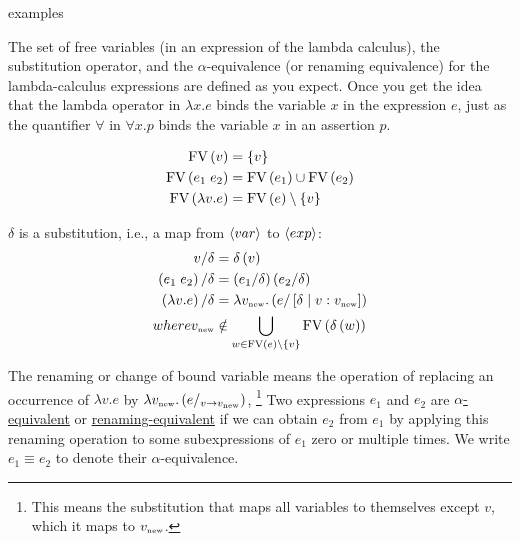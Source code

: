 \begin{enumcirc}
	\item
	examples
	\todo
	\item
	The set of free variables (in an expression of the lambda calculus), the
	substitution operator, and the $\alpha$-equivalence (or renaming equivalence)
	for the lambda-calculus expressions are defined as you expect.
	Once you get the idea that the lambda operator in $\lambda x. e$ binds the
	variable $x$ in the expression $e$, just as the quantifier $\forall$ in
	$\forall x. p$ binds the variable $x$ in an assertion $p$.
	\begin{enumrm}
		\item
		\begin{align*}
			\textrm{FV}\left(  v  \right)            & = \left\{ v \right\}                  \\
			\textrm{FV}\left(  e_1 \; e_2  \right)   & = \textrm{FV}\left(  e_1  \right) \cup \textrm{FV}\left(  e_2  \right)      \\
			\textrm{FV}\left(  \lambda v. e  \right) & = \textrm{FV}\left(  e  \right) \setminus \left\{ v \right\} \\
		\end{align*}
		\item
		$\delta$ is a substitution, i.e., a map from $\left\langle var \right\rangle$ to $\left\langle exp \right\rangle$:
		\begin{align*}
			v / \delta                    & = \delta\left( v \right)                                                             \\
			\left( e_1 \; e_2 \right) / \delta   & = \left( e_1 / \delta \right) \left( e_2 / \delta \right)                                   \\
			\left( \lambda v. e \right) / \delta & = \lambda v_{\textrm{\tiny new}}. \left( e / \left[ \delta \; \middle\vert \; v: v_{\textrm{\tiny new}} \right] \right) \\
			where v_{\textrm{\tiny new}}      & \notin \bigcup_{w \in \textrm{FV}\left(  e  \right) \setminus \left\{ v \right\}} \textrm{FV}\left(  \delta\left( w \right)  \right)
		\end{align*}
		\item
		The renaming or change of bound variable means the operation of replacing an
		occurrence of $\lambda v. e$ by
		$\lambda v_{\textrm{\tiny new}}. \left( e/_{v \rightarrow v_{\textrm{\tiny new}}} \right)$,
		\footnote{
			This means the substitution that maps all variables to themselves except $v$, which
			it maps to $v_{\textrm{\tiny new}}$.
		}
		Two expressions $e_1$ and $e_2$ are \ul{$\alpha$-equivalent} or
		\ul{renaming-equivalent} if we can obtain $e_2$ from $e_1$ by applying this
		renaming operation to some subexpressions of $e_1$ zero or multiple times.
		We write $e_1 \equiv e_2$ to denote their $\alpha$-equivalence.
		\begin{example}
			\todo
		\end{example}
	\end{enumrm}
\end{enumcirc}

